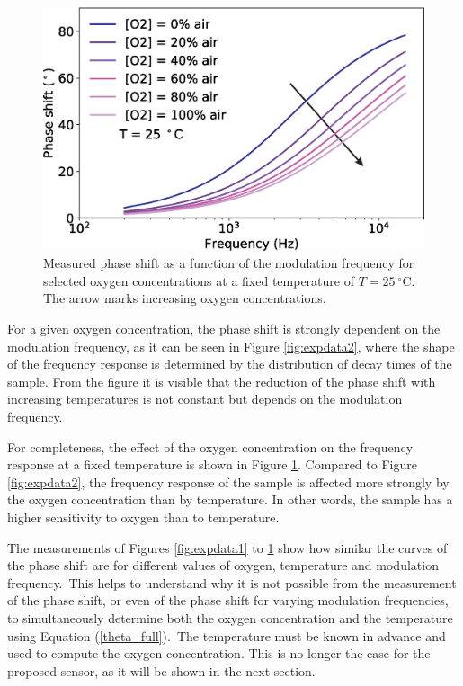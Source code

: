 \documentclass[sensors,article,accept,moreauthors,pdftex,10pt,a4paper]{Definitions/mdpi}
\begin{document}
\begin{figure}[H]
\centering
\includegraphics[width=9 cm]{phase_f_O2.eps}
\caption{Measured phase shift as a function of the modulation frequency for selected oxygen concentrations at a fixed temperature of $T=25 \ ^{\circ}$C. The arrow marks increasing oxygen concentrations.}
\label{fig:expdata3}
\end{figure}

For a given oxygen concentration, the phase shift is strongly dependent on the modulation frequency, as it can be seen in Figure \ref{fig:expdata2}, where the shape of the frequency response is determined by the distribution of decay times of the sample. From the figure it is visible that the reduction of the phase shift with increasing temperatures is not constant but depends on the modulation frequency.



For completeness, the effect of the oxygen concentration on the frequency response at a fixed temperature is shown in Figure \ref{fig:expdata3}. Compared to Figure \ref{fig:expdata2}, the frequency response of the sample is affected more strongly by the oxygen concentration than by temperature. In other words, the sample has a higher sensitivity to oxygen than to temperature.



The measurements of Figures \ref{fig:expdata1} to \ref{fig:expdata3} show how similar the curves of the phase shift are for different values of oxygen, temperature and modulation frequency.~This helps to understand why it is not possible from the measurement of the phase shift, or even of the phase shift for varying modulation frequencies, to simultaneously determine both the oxygen concentration and the temperature using Equation (\ref{theta_full}).~The temperature must be known in advance and used to compute the oxygen concentration. This is no longer the case for the proposed sensor, as it will be shown in the next section. 
\end{document}
